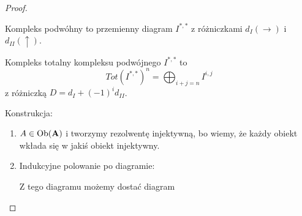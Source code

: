 \begin{proof}
  \begin{definition}
    Kompleks podwóhny to przemienny diagram $I^{*,*}$ z różniczkami $d_I(\to)$ i $d_{II}(\uparrow)$.

    Kompleks totalny kompleksu podwójnego $I^{*,*}$ to 
    $$Tot(I^{*,*})^n=\bigoplus_{i+j=n}I^{i,j}$$
    z różniczką $D=d_I+(-1)^id_{II}$. 
  \end{definition}


  Konstrukcja:
  \begin{enumerate}
    \item $A\in\operatorname{Ob}(\mathbf{A})$ i tworzymy rezolwentę injektywną, bo wiemy, że każdy obiekt wkłada się w jakiś obiekt injektywny.
      \begin{center}\end{center}
    \item Indukcyjne polowanie po diagramie:
      \begin{center}\end{center}
      Z tego diagramu możemy dostać diagram
      \begin{center}
\end{center}
\end{enumerate}
\end{proof}

